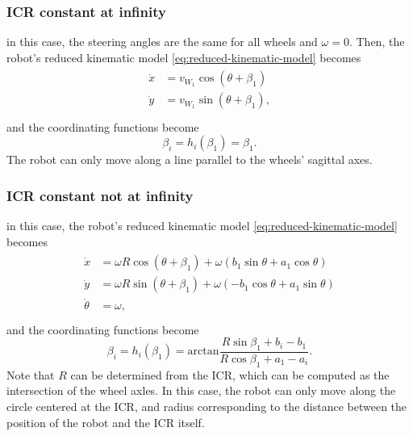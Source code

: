 \subsubsection{ICR constant at infinity}
\label{sec:icr-constant-at-infinity}
in this case, the steering angles are the same for all wheels and $\omega = 0$.
Then, the robot's reduced kinematic model \eqref{eq:reduced-kinematic-model} becomes
\begin{align}
\label{eq:icr-constant-at-infinity-kinematic-model}
\begin{split}
    \dot{x} &= v_{W_1} \cos(\theta + \beta_1) \\
    \dot{y} &= v_{W_1} \sin(\theta + \beta_1), \\
\end{split}
\end{align}
and the coordinating functions become
\begin{equation*}
    \beta_i = h_i(\beta_1) = \beta_1.
\end{equation*}
The robot can only move along a line parallel to the wheels' sagittal axes.

\subsubsection{ICR constant not at infinity}
\label{sec:icr-constant-not-at-infinity}
in this case, the robot's reduced kinematic model \eqref{eq:reduced-kinematic-model} becomes
\begin{align}
\label{eq:icr-constant-not-at-infinity-kinematic-model}
\begin{split}
    \dot{x} &= \omega R \cos(\theta + \beta_1) + \omega (b_1 \sin\theta + a_1 \cos\theta) \\
    \dot{y} &= \omega R \sin(\theta + \beta_1) + \omega (-b_1 \cos\theta + a_1 \sin\theta) \\
    \dot{\theta} &= \omega, \\
\end{split}
\end{align}
and the coordinating functions become
\begin{equation*}
    \beta_i = h_i(\beta_1) = \mathrm{arctan}\frac{R \sin\beta_1 + b_i - b_1}{R \cos\beta_1 + a_1 - a_i}.
\end{equation*}
Note that $R$ can be determined from the ICR, which can be computed as the
intersection of the wheel axles. In this case, the robot can only move along
the circle centered at the ICR, and radius corresponding to the distance between
the position of the robot and the ICR itself.

